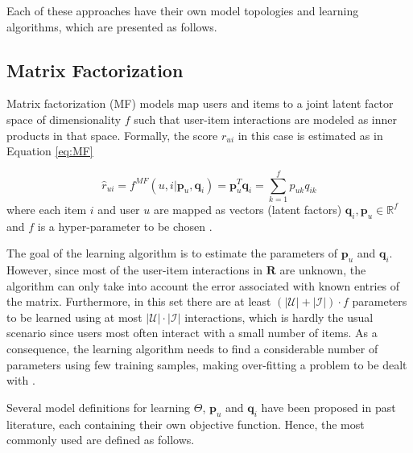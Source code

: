 Each of these approaches have their own model topologies and learning algorithms, which are presented as follows.






\subsection{Matrix Factorization}

    Matrix factorization (MF)  models map users and items to a joint latent factor space of dimensionality $f$ such that user-item interactions are modeled as inner products in that space. Formally, the score $r_{ui}$ in this case is estimated as in Equation \ref{eq:MF}
    
    \begin{equation}
        \label{eq:MF}
        \hat{r}_{ui} = f^{MF}(u,i|\mathbf{p}_u, \mathbf{q}_i) = \mathbf{p}_u^T \mathbf{q}_i = \sum_{k=1}^f p_{uk}q_{ik}
    \end{equation} where each item $i$ and user $u$ are mapped as vectors (latent factors) $\mathbf{q}_i, \mathbf{p}_u \in \mathbb{R}^f$ and $f$ is a hyper-parameter to be chosen \cite{10.1145/3038912.3052569,2009MFTechniques}.
    
    The goal of the learning algorithm is to estimate the parameters of $\mathbf{p}_u$ and $\mathbf{q}_i$. However, since most of the user-item interactions in $\mathbf{R}$ are unknown, the algorithm can only take into account the error associated with known entries of the matrix. Furthermore, in this set there are at least $(|\mathcal{U}|+|\mathcal{I}|)\cdot f$ parameters to be learned using at most $|\mathcal{U}|\cdot |\mathcal{I}|$ interactions, which is hardly the usual scenario since users most often interact with a small number of items. As a consequence, the learning algorithm needs to find a considerable number of parameters using few training samples, making over-fitting a problem to be dealt with \cite{2008ALSWR}.
    
    
    
    
   Several model definitions for learning $\Theta$, $\mathbf{p}_u$ and $\mathbf{q}_i$ have been proposed in past literature, each containing their own objective function. Hence, the most commonly used are defined as follows.
   

